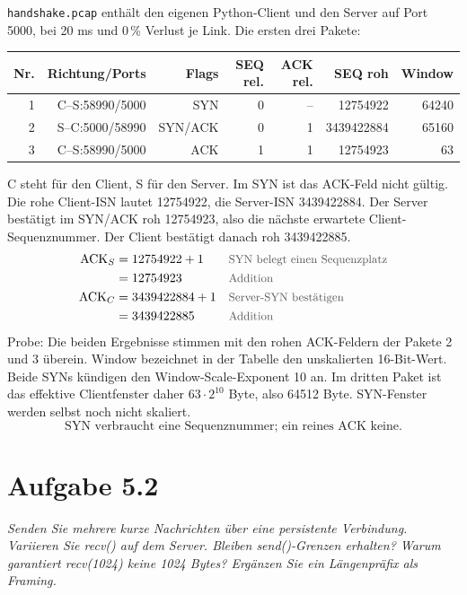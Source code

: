 \documentclass[a4paper,11pt]{article}
\newif\ifexplain
\newcommand{\aufgabe}[1]{\section*{Aufgabe #1}}
\newcommand{\angabe}[1]{\textit{#1}\par\smallskip}
\newcommand{\why}[1]{\text{\small\color{black!65}#1}}
\newcommand{\explain}[1]{\ifexplain\begin{erklbox}#1\end{erklbox}\fi}
\begin{document}
\texttt{handshake.pcap} enthält den eigenen Python-Client und den Server auf
Port 5000, bei 20 ms und 0\,\% Verlust je Link. Die ersten drei Pakete:
\begin{center}\small
\begin{tabular}{rrrrrrr}\toprule
Nr. & Richtung/Ports & Flags & SEQ rel. & ACK rel. & SEQ roh & Window\\\midrule
1 & C--S:58990/5000 & SYN & 0 & -- & 12754922 & 64240\\
2 & S--C:5000/58990 & SYN/ACK & 0 & 1 & 3439422884 & 65160\\
3 & C--S:58990/5000 & ACK & 1 & 1 & 12754923 & 63\\
\bottomrule\end{tabular}\end{center}
C steht für den Client, S für den Server. Im SYN ist das ACK-Feld nicht gültig.
Die rohe Client-ISN lautet 12754922, die Server-ISN 3439422884.
Der Server bestätigt im SYN/ACK roh 12754923, also die nächste erwartete
Client-Sequenznummer. Der Client bestätigt danach roh 3439422885.
\begin{align*}
\mathrm{ACK}_{S} &= 12754922 + 1 && \why{SYN belegt einen Sequenzplatz}\\
&= 12754923 && \why{Addition}\\
\mathrm{ACK}_{C} &= 3439422884 + 1 && \why{Server-SYN bestätigen}\\
&= 3439422885 && \why{Addition}
\end{align*}
Probe: Die beiden Ergebnisse stimmen mit den rohen ACK-Feldern der Pakete
2 und 3 überein. Window bezeichnet in der Tabelle den unskalierten 16-Bit-Wert.
Beide SYNs kündigen den Window-Scale-Exponent 10 an. Im dritten Paket ist das effektive Clientfenster daher $ 63\cdot 2^{10}$ Byte, also 64512 Byte. SYN-Fenster werden selbst noch nicht skaliert.
\[\boxed{\text{SYN verbraucht eine Sequenznummer; ein reines ACK keine.}}\]
\explain{Die Initial Sequence Number (ISN) ist die Startnummer einer Richtung.
Wireshark zeigt sie normalerweise relativ als 0 an. Das heißt nicht, dass im
TCP-Header eine 0 steht. Beide Richtungen haben ihre eigene Nummerierung.
Das SYN gehört in den Sequenzraum, damit ein wiederholtes SYN als dasselbe
Steuerereignis erkannt und bestätigt werden kann. Sonst könnte ein verloren
gegangenes SYN nicht auf dieselbe Weise behandelt werden wie verlorene Daten.
Window ist dagegen der Empfangspuffer, den die Gegenseite gerade anbietet.
Es ist nicht das Congestion Window des Senders.}

\aufgabe{5.2}
\angabe{Senden Sie mehrere kurze Nachrichten über eine persistente Verbindung. Variieren Sie recv() auf dem Server. Bleiben send()-Grenzen erhalten? Warum garantiert recv(1024) keine 1024 Bytes? Ergänzen Sie ein Längenpräfix als Framing.}
\end{document}
